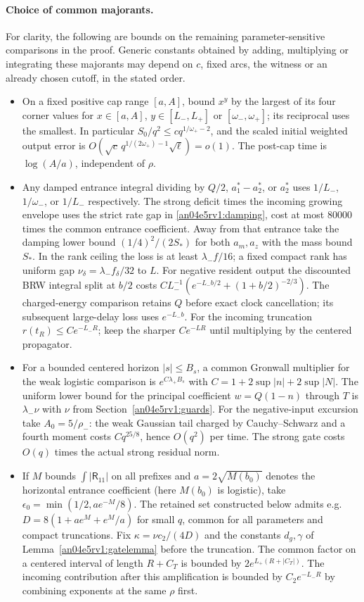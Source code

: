 \documentclass[11pt]{article}
\begin{document}
\paragraph{Choice of common majorants.}
For clarity, the following are bounds on the remaining parameter-sensitive comparisons in the proof. Generic constants obtained by adding, multiplying or integrating these majorants may depend on $c$, fixed arcs, the witness or an already chosen cutoff, in the stated order.
\begin{itemize}
\item On a fixed positive cap range $[a,A]$, bound $x^y$ by the largest of its four corner values for $x\in[a,A]$, $y\in[L_-,L_+]$ or $[\omega_-,\omega_+]$; its reciprocal uses the smallest. In particular $S_0/q^2\le c q^{1/\omega_+-2}$, and the scaled initial weighted output error is $O(\sqrt c\,q^{1/(2\omega_+)-1}\sqrt\ell)=o(1)$. The post-cap time is $\log(A/a)$, independent of $\rho$.
\item Any damped entrance integral dividing by $Q/2$, $a_1^*-a_2^*$, or $a_2^*$ uses $1/L_-$, $1/\omega_-$, or $1/L_-$ respectively. The strong deficit times the incoming growing envelope uses the strict rate gap in \eqref{an04e5rv1:damping}, cost at most $80000$ times the common entrance coefficient. Away from that entrance take the damping lower bound $(1/4)^2/(2S_*)$ for both $a_m,a_z$ with the mass bound $S_*$. In the rank ceiling the loss is at least $\lambda_-f/16$; a fixed compact rank has uniform gap $\nu_\delta=\lambda_-f_\delta/32$ to $L$. For negative resident output the discounted BRW integral split at $b/2$ costs $C L_-^{-1}(e^{-L_- b/2}+(1+b/2)^{-2/3})$. The charged-energy comparison retains $Q$ before exact clock cancellation; its subsequent large-delay loss uses $e^{-L_-b}$. For the incoming truncation $r(t_R)\le C e^{-L_-R}$; keep the sharper $Ce^{-LR}$ until multiplying by the centered propagator.
\item For a bounded centered horizon $|s|\le B_s$, a common Gronwall multiplier for the weak logistic comparison is $e^{C\lambda_+ B_s}$ with $C=1+2\sup|n|+2\sup|N|$. The uniform lower bound for the principal coefficient $w=Q(1-n)$ through $T$ is $\lambda_- \nu$ with $\nu$ from Section~\ref{an04e5rv1:guards}. For the negative-input excursion take $A_0=5/\rho_-$: the weak Gaussian tail charged by Cauchy--Schwarz and a fourth moment costs $Cq^{25/8}$, hence $O(q^2)$ per time. The strong gate costs $O(q)$ times the actual strong residual norm.
\item If $M$ bounds $\int |\mathsf R_{11}|$ on all prefixes and $a=2\sqrt{M(b_0)}$ denotes the horizontal entrance coefficient (here $M(b_0)$ is logistic), take $\epsilon_0=\min(1/2,ae^{-M}/8)$. The retained set constructed below admits e.g. $D=8(1+a e^M+e^M/a)$ for small $q$, common for all parameters and compact truncations. Fix $\kappa=\nu c_2/(4D)$ and the constants $d_g,\gamma$ of Lemma~\ref{an04e5rv1:gatelemma} before the truncation. The common factor on a centered interval of length $R+C_T$ is bounded by $2e^{L_+(R+|C_T|)}$. The incoming contribution after this amplification is bounded by $C_2e^{-L_-R}$ by combining exponents at the same $\rho$ first.
\end{itemize}
\end{document}
